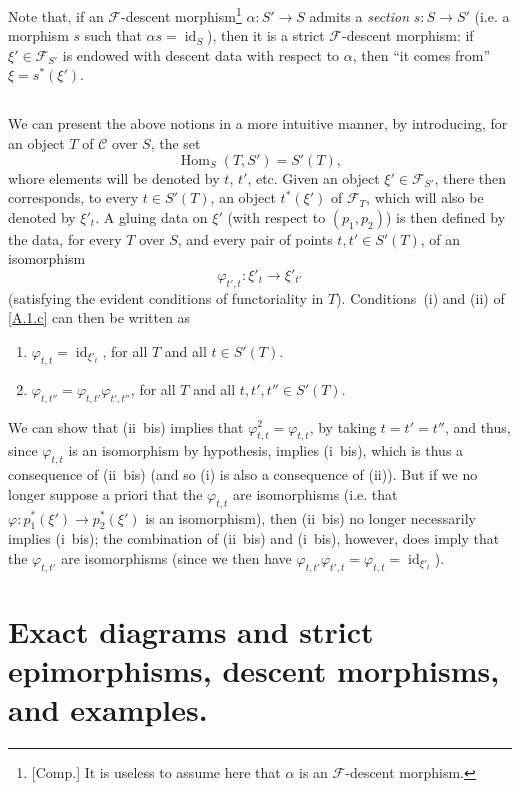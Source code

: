 \documentclass{article}
\theoremstyle{plain}
\theoremstyle{definition}
\newcommand{\sh}[1]{{\mathscr{#1}}}
\newcommand{\cat}[1]{{\mathcal{#1}}}
\DeclareMathOperator{\id}{id}
\DeclareMathOperator{\Hom}{Hom}
\newcommand{\oldpage}[1]{\marginpar{\footnotesize$\Big\vert$ \textit{p.~#1}}}
\begin{document}
Note that, if an $\sh{F}$-descent morphism\footnote{[Comp.] It is useless to assume here that $\alpha$ is an $\sh{F}$-descent morphism.} $\alpha\colon S'\to S$ admits a \emph{section} $s\colon S\to S'$ (i.e. a morphism $s$ such that $\alpha s=\id_S$), then it is a strict $\sh{F}$-descent morphism:
if $\xi'\in\sh{F}_{S'}$ is endowed with descent data with respect to $\alpha$, then ``it comes from'' $\xi=s^*(\xi')$.


\subsection{}
\label{A.1.d}
We can present the above notions in a more intuitive manner, by introducing, for an object $T$ of $\cat{C}$ over $S$, the set
\[
  \Hom_S(T,S') = S'(T),
\]
whore elements will be denoted by $t$, $t'$, etc.
Given an object $\xi'\in\sh{F}_{S'}$, there then corresponds, to every $t\in S'(T)$, an object $t^*(\xi')$ of $\sh{F}_T$, which will also be denoted by $\xi'_t$.
A gluing data on $\xi'$ (with respect to $(p_1,p_2)$) is then defined by the data, for every $T$ over $S$, and every pair of points $t,t'\in S'(T)$, of an isomorphism
\[
  \varphi_{t',t}\colon \xi'_t \to \xi'_{t'}
\]
(satisfying the evident conditions of functoriality in $T$).
Conditions~(i) and (ii) of \cref{A.1.c} can then be written as
\begin{enumerate}[(i {bis})]
  \item $\varphi_{t,t}=\id_{\xi'_t}$, for all $T$ and all $t\in S'(T)$.
\oldpage{190-06}
  \item $\varphi_{t,t''}=\varphi_{t,t'}\varphi_{t',t''}$, for all $T$ and all $t,t',t''\in S'(T)$.
\end{enumerate}

We can show that (ii~bis) implies that $\varphi_{t,t}^2=\varphi_{t,t}$, by taking $t=t'=t''$, and thus, since $\varphi_{t,t}$ is an isomorphism by hypothesis, implies (i~bis), which is thus a consequence of (ii~bis) (and so (i) is also a consequence of (ii)).
But if we no longer suppose a priori that the $\varphi_{t,t}$ are isomorphisms (i.e. that $\varphi\colon p_1^*(\xi')\to p_2^*(\xi')$ is an isomorphism), then (ii~bis) no longer necessarily implies (i~bis);
the combination of (ii~bis) and (i~bis), however, does imply that the $\varphi_{t,t'}$ are isomorphisms (since we then have $\varphi_{t,t'}\varphi_{t',t}=\varphi_{t,t}=\id_{\xi'_t}$).


\section{Exact diagrams and strict epimorphisms, descent morphisms, and examples.}
\label{A.2}
\end{document}
